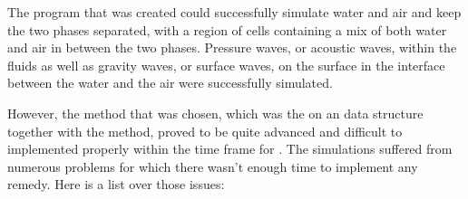 
The program that was created could successfully simulate water and air and keep the two phases separated, with a region of cells containing a mix of both water and air in between the two phases. Pressure waves, or acoustic waves, within the fluids as well as gravity waves, or surface waves, on the surface in the interface between the water and the air were successfully simulated.


However, the method that was chosen, which was the \FVM on an \octree data structure together with the \VOF method, proved to be quite advanced and difficult to implemented properly within the time frame for \thismasterthesiswork. The simulations suffered from numerous problems for which there wasn't enough time to implement any remedy. Here is a list over those issues:


